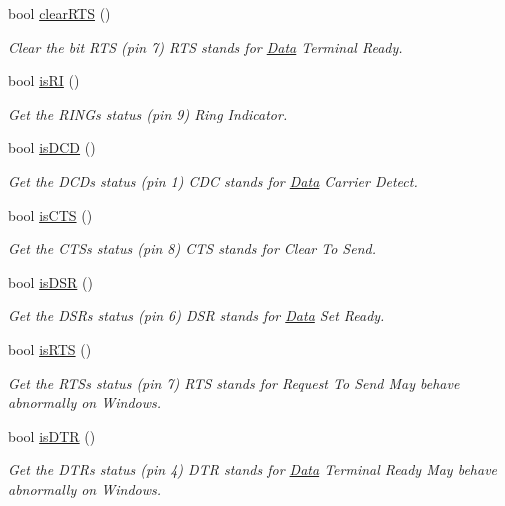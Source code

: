 \begin{DoxyCompactItemize}
bool \hyperlink{classserialib_ab0b5882339240002fccf7701f5321e0a}{clear\+R\+TS} ()
\begin{DoxyCompactList}\small\item\em Clear the bit R\+TS (pin 7) R\+TS stands for \hyperlink{classData}{Data} Terminal Ready. \end{DoxyCompactList}\item 
bool \hyperlink{classserialib_a605d8a8015fadb5db5521350aefe084e}{is\+RI} ()
\begin{DoxyCompactList}\small\item\em Get the R\+I\+NG\textquotesingle{}s status (pin 9) Ring Indicator. \end{DoxyCompactList}\item 
bool \hyperlink{classserialib_a5f451a5eea7c8c1bdcff684ba131d6ff}{is\+D\+CD} ()
\begin{DoxyCompactList}\small\item\em Get the D\+CD\textquotesingle{}s status (pin 1) C\+DC stands for \hyperlink{classData}{Data} Carrier Detect. \end{DoxyCompactList}\item 
bool \hyperlink{classserialib_aca544a6f8dfa33f8e771713646768215}{is\+C\+TS} ()
\begin{DoxyCompactList}\small\item\em Get the C\+TS\textquotesingle{}s status (pin 8) C\+TS stands for Clear To Send. \end{DoxyCompactList}\item 
bool \hyperlink{classserialib_a3f1f0894543dfb17955de50157965dd7}{is\+D\+SR} ()
\begin{DoxyCompactList}\small\item\em Get the D\+SR\textquotesingle{}s status (pin 6) D\+SR stands for \hyperlink{classData}{Data} Set Ready. \end{DoxyCompactList}\item 
bool \hyperlink{classserialib_ab2b121af07fb732f82668f6a14e93cfb}{is\+R\+TS} ()
\begin{DoxyCompactList}\small\item\em Get the R\+TS\textquotesingle{}s status (pin 7) R\+TS stands for Request To Send May behave abnormally on Windows. \end{DoxyCompactList}\item 
bool \hyperlink{classserialib_a4ec78286be81602bf1df44a4eb8372a8}{is\+D\+TR} ()
\begin{DoxyCompactList}\small\item\em Get the D\+TR\textquotesingle{}s status (pin 4) D\+TR stands for \hyperlink{classData}{Data} Terminal Ready May behave abnormally on Windows. \end{DoxyCompactList}\end{DoxyCompactItemize}


